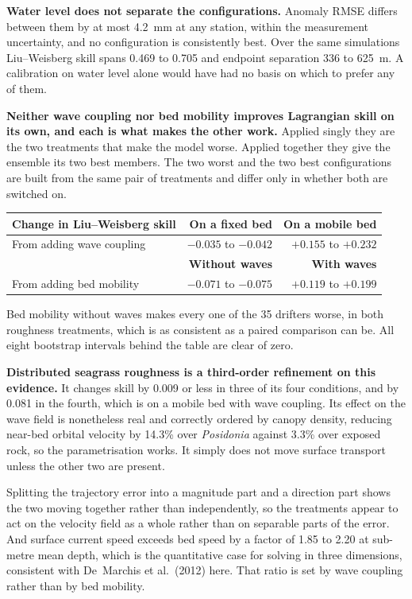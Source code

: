 \documentclass[11pt]{article}
\begin{document}
\textbf{Water level does not separate the configurations.} Anomaly RMSE differs
between them by at most 4.2~mm at any station, within the measurement
uncertainty, and no configuration is consistently best. Over the same
simulations Liu--Weisberg skill spans 0.469 to 0.705 and endpoint separation 336
to 625~m. A calibration on water level alone would have had no basis on which to
prefer any of them.

\textbf{Neither wave coupling nor bed mobility improves Lagrangian skill on its
own, and each is what makes the other work.} Applied singly they are the two
treatments that make the model worse. Applied together they give the ensemble
its two best members. The two worst and the two best configurations are built
from the same pair of treatments and differ only in whether both are switched
on.

\begin{center}
\begin{tabular}{lrr}
\toprule
Change in Liu--Weisberg skill & On a fixed bed & On a mobile bed \\
\midrule
From adding wave coupling & $-0.035$ to $-0.042$ & $+0.155$ to $+0.232$ \\
\midrule
                          & \textbf{Without waves} & \textbf{With waves} \\
From adding bed mobility  & $-0.071$ to $-0.075$ & $+0.119$ to $+0.199$ \\
\bottomrule
\end{tabular}
\end{center}

Bed mobility without waves makes every one of the 35 drifters worse, in both
roughness treatments, which is as consistent as a paired comparison can be. All
eight bootstrap intervals behind the table are clear of zero.

\textbf{Distributed seagrass roughness is a third-order refinement on this
evidence.} It changes skill by 0.009 or less in three of its four conditions,
and by 0.081 in the fourth, which is on a mobile bed with wave coupling. Its
effect on the wave field is nonetheless real and correctly ordered by canopy
density, reducing near-bed orbital velocity by 14.3\% over \emph{Posidonia}
against 3.3\% over exposed rock, so the parametrisation works. It simply does
not move surface transport unless the other two are present.

Splitting the trajectory error into a magnitude part and a direction part shows
the two moving together rather than independently, so the treatments appear to
act on the velocity field as a whole rather than on separable parts of the
error. And surface current speed exceeds bed speed by a factor of 1.85 to 2.20
at sub-metre mean depth, which is the quantitative case for solving in three
dimensions, consistent with De~Marchis et al.\ (2012) here. That ratio is set by
wave coupling rather than by bed mobility.
\end{document}
